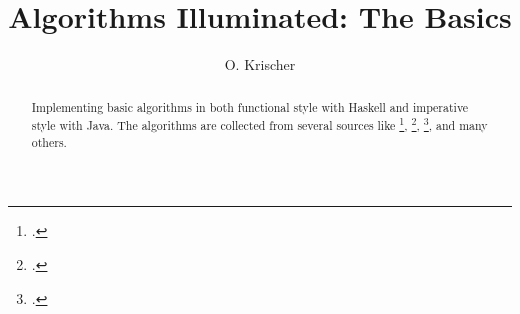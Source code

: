 \documentclass{scrartcl}
\numberwithin{equation}{section}
\begin{document}


\title{Algorithms Illuminated: The Basics}
\author{O. Krischer}
\maketitle
\begin{abstract}
   Implementing basic algorithms in both functional style with Haskell and imperative style with Java.
   The algorithms are collected from several sources like  \footcite{rough18},
    \footcite{algsj21},  \footcite{algsc98}, and many others.
\end{abstract}
\tableofcontents



\printbibliography
\end{document}
